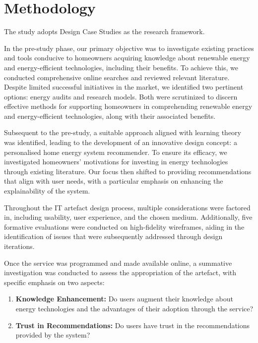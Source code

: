 \chapter{Methodology}

The study adopts Design Case Studies \cite{dcs} as the research framework.

In the pre-study phase, our primary objective was to investigate existing practices and tools conducive to homeowners acquiring knowledge about renewable energy and energy-efficient technologies, including their benefits. 
To achieve this, we conducted comprehensive online searches and reviewed relevant literature. Despite limited successful initiatives in the market, we identified two pertinent options: energy audits and research models. 
Both were scrutinized to discern effective methods for supporting homeowners in comprehending renewable energy and energy-efficient technologies, along with their associated benefits.

Subsequent to the pre-study, a suitable approach aligned with learning theory was identified, leading to the development of an innovative design concept: a personalised home energy system recommender. 
To ensure its efficacy, we investigated homeowners' motivations for investing in energy technologies through existing literature. 
Our focus then shifted to providing recommendations that align with user needs, with a particular emphasis on enhancing the explainability of the system.

Throughout the IT artefact design process, multiple considerations were factored in, including usability, user experience, and the chosen medium. 
Additionally, five formative evaluations were conducted on high-fidelity wireframes, aiding in the identification of issues that were subsequently addressed through design iterations.

Once the service was programmed and made available online, a summative investigation was conducted to assess the appropriation of the artefact, with specific emphasis on two aspects:

\begin{enumerate}
    \item \textbf{Knowledge Enhancement:} Do users augment their knowledge about energy technologies and the advantages of their adoption through the service?
    \item \textbf{Trust in Recommendations:} Do users have trust in the recommendations provided by the system?
\end{enumerate}


